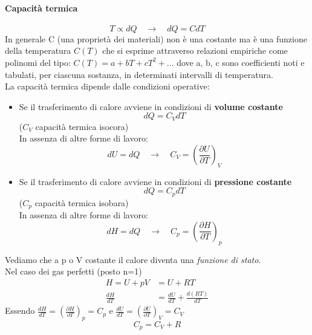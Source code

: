 \documentclass{article}
\newcommand{\so}{\quad \rightarrow \quad}
\begin{document}
\paragraph{Capacità termica}
\begin{equation*}
    T \propto dQ \so dQ=CdT
\end{equation*}
In generale \gls{C} (una proprietà dei materiali) non è una costante ma è una funzione della temperatura $C(T)$ che si esprime attraverso relazioni empiriche come polinomi del tipo: $C(T)=a+bT+cT^2+...$ dove a, b, c sono coefficienti noti e tabulati, per ciascuna sostanza, in determinati intervalli di temperatura.
\\ La capacità termica dipende dalle condizioni operative:
\begin{itemize}
    \item Se il trasferimento di calore avviene in condizioni di \textbf{volume costante}
      \begin{equation*}
           dQ=C_VdT
      \end{equation*}
      ($C_V$ capacità termica isocora)\\
      In assenza di altre forme di lavoro: 
      \begin{equation*}
          dU=dQ \so C_V=(\frac{\partial U}{\partial T})_V
      \end{equation*}
      \item Se il trasferimento di calore avviene in condizioni di \textbf{pressione costante}
      \begin{equation*}
           dQ=C_pdT
      \end{equation*}
      ($C_p$ capacità termica isobara)\\
      In assenza di altre forme di lavoro: 
      \begin{equation*}
          dH=dQ \so C_p=(\frac{\partial H}{\partial T})_p
      \end{equation*}
\end{itemize}
Vediamo che a p o V costante il calore diventa una \textit{funzione di stato}. \\
Nel caso dei gas perfetti (posto n=1)
\begin{align*}
    H=U+pV&=U+RT\\
    \frac{dH}{dT}&=\frac{dU}{dT}+\frac{d(RT)}{dT}
\end{align*}
Essendo $\frac{dH}{dT}=(\frac{\partial H}{\partial T})_p=C_p$ e $\frac{dU}{dT}=(\frac{\partial U}{\partial T})_V=C_V$
\begin{equation*}
    C_p=C_V+R
\end{equation*}
\end{document}
